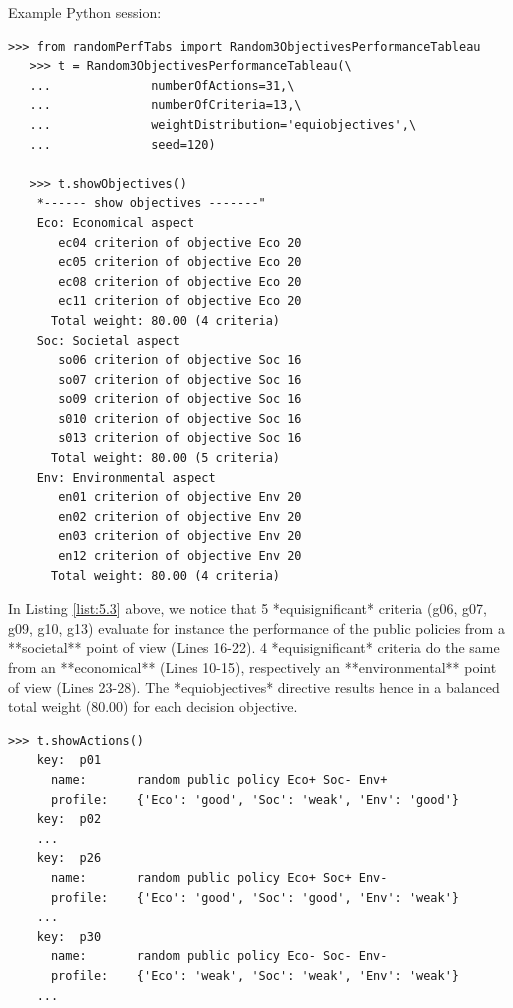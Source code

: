 Example Python session:

\begin{lstlisting}[caption={Generating a random 3 Objectives performance tableau},label=list:5.3,basicstyle=\footnotesize]
   >>> from randomPerfTabs import Random3ObjectivesPerformanceTableau
   >>> t = Random3ObjectivesPerformanceTableau(\
   ...              numberOfActions=31,\
   ...              numberOfCriteria=13,\
   ...              weightDistribution='equiobjectives',\
   ...              seed=120)

   >>> t.showObjectives()
    *------ show objectives -------"
    Eco: Economical aspect
       ec04 criterion of objective Eco 20
       ec05 criterion of objective Eco 20
       ec08 criterion of objective Eco 20
       ec11 criterion of objective Eco 20
      Total weight: 80.00 (4 criteria)
    Soc: Societal aspect
       so06 criterion of objective Soc 16
       so07 criterion of objective Soc 16
       so09 criterion of objective Soc 16
       s010 criterion of objective Soc 16
       s013 criterion of objective Soc 16
      Total weight: 80.00 (5 criteria)
    Env: Environmental aspect
       en01 criterion of objective Env 20
       en02 criterion of objective Env 20
       en03 criterion of objective Env 20
       en12 criterion of objective Env 20
      Total weight: 80.00 (4 criteria)
    \end{lstlisting}

In Listing \ref{list:5.3} above, we notice that 5 *equisignificant* criteria (g06, g07, g09, g10, g13) evaluate for instance the performance of the public policies from a **societal** point of view (Lines 16-22). 4 *equisignificant* criteria do the same from an **economical** (Lines 10-15), respectively an **environmental** point of view (Lines 23-28). The *equiobjectives* directive results hence in a balanced total weight (80.00) for each decision objective. 

\begin{lstlisting}[basicstyle=\footnotesize]
   >>> t.showActions()
    key:  p01
      name:       random public policy Eco+ Soc- Env+
      profile:    {'Eco': 'good', 'Soc': 'weak', 'Env': 'good'}
    key:  p02
    ...
    key:  p26
      name:       random public policy Eco+ Soc+ Env-
      profile:    {'Eco': 'good', 'Soc': 'good', 'Env': 'weak'}
    ...
    key:  p30
      name:       random public policy Eco- Soc- Env-
      profile:    {'Eco': 'weak', 'Soc': 'weak', 'Env': 'weak'}
    ...
 \end{lstlisting}
  
